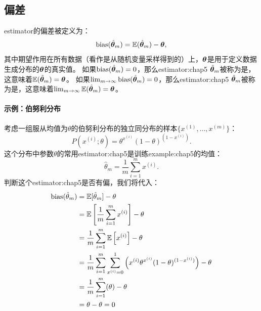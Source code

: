 \subsection{偏差}
\label{sec:bias}
\gls{estimator}的偏差被定义为：
\begin{equation}
\label{eq:5.20}
    \text{bias}(\hat{\boldsymbol{\theta}}_m) = \mathbb{E}(\hat{\boldsymbol{\theta}}_m) - \boldsymbol{\theta},
\end{equation}
其中期望作用在所有数据（看作是从随机变量采样得到的）上，$\boldsymbol{\theta}$是用于定义数据生成分布的$\boldsymbol{\theta}$的真实值。
如果$\text{bias}(\hat{\boldsymbol{\theta}}_m)=0$，那么\gls{estimator:chap5} $\hat{\boldsymbol{\theta}}_m$被称为是，这意味着$\mathbb{E}(\hat{\boldsymbol{\theta}}_m) = \boldsymbol{\theta}$。
如果$\lim_{m\to\infty} \text{bias}(\hat{\boldsymbol{\theta}}_m)=0$，那么\gls{estimator:chap5} $\hat{\boldsymbol{\theta}}_m$被称为是，这意味着$\lim_{m\to\infty} \mathbb{E}(\hat{\boldsymbol{\theta}}_m) = \boldsymbol{\theta}$。


\paragraph{示例：伯努利分布}
考虑一组服从均值为$\theta$的伯努利分布的独立同分布的样本$\{x^{(1)}, \dots , x^{(m)}\}$：
\begin{equation}
    P(x^{(i)}; \theta) = \theta^{x^{(i)}} (1-\theta)^{(1 - x^{(i)})}.
\end{equation}
这个分布中参数$\theta$的常用\gls{estimator:chap5}是训练\gls{example:chap5}的均值：
\begin{equation}
\label{eq:5.22}
    \hat{\theta}_m = \frac{1}{m} \sum_{i=1}^m x^{(i)}.
\end{equation}
判断这个\gls{estimator:chap5}是否有偏，我们将代入：
\begin{align}
    \text{bias}(\hat{\theta}_m)     &= \mathbb{E}[\hat{\theta}_m] - \theta  \\
            &= \mathbb{E} \left[ \frac{1}{m} \sum_{i=1}^m x^{(i)} \right] - \theta \\
            &= \frac{1}{m} \sum_{i=1}^m \mathbb{E} \left[x^{(i)} \right] - \theta \\
            &= \frac{1}{m} \sum_{i=1}^m \sum_{x^{(i)} = 0}^1 \left( x^{(i)} \theta^{x^{(i)}} (1-\theta)^{(1-x^{(i)})} \right) - \theta \\
            &= \frac{1}{m} \sum_{i=1}^m (\theta) - \theta \\
            &= \theta - \theta = 0
\end{align}

